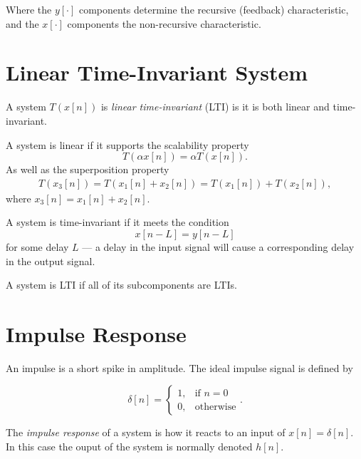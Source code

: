 \documentclass[openany]{book}
\def\lsqb{\left[}
\def\rsqb{\right]}
\def\sqb#1{\lsqb #1 \rsqb}
\def\xsig{x\sqb{n}}
\begin{document}
Where the $y\sqb{\cdot}$ components determine the recursive (feedback) characteristic, and the $x\sqb{\cdot}$ components the non-recursive characteristic.

\section{Linear Time-Invariant System}

A system $T(x\sqb{n})$ is \textit{linear time-invariant} (LTI) is it is both linear and time-invariant.

A system is linear if it supports the scalability property 
\begin{equation}
    T(\alpha \xsig) = \alpha T(\xsig).
\end{equation}
As well as the superposition property 
\begin{gather}
    T(x_3\sqb{n}) = T(x_1\sqb{n} + x_2\sqb{n}) =  T(x_1\sqb{n}) + T(x_2\sqb{n}), 
\end{gather}
where $x_3\sqb{n} = x_1\sqb{n} + x_2\sqb{n}$.

A system is time-invariant if it meets the condition
\begin{equation}
    x\sqb{n - L} = y\sqb{n - L}
\end{equation}
for some delay $L$ --- a delay in the input signal will cause a corresponding delay in the output signal.

A system is LTI if all of its subcomponents are LTIs.

\section{Impulse Response}
An impulse is a short spike in amplitude. The ideal impulse signal is defined by

\begin{equation}
    \delta\sqb{n} =
        \begin{cases}
            1, & \text{if } n = 0 \\
            0, & \text{otherwise}
        \end{cases}.
\end{equation}

The \textit{impulse response} of a system is how it reacts to an input of $\xsig = \delta\sqb{n}$. In this
case the ouput of the system is normally denoted $h\sqb{n}$.
\end{document}
